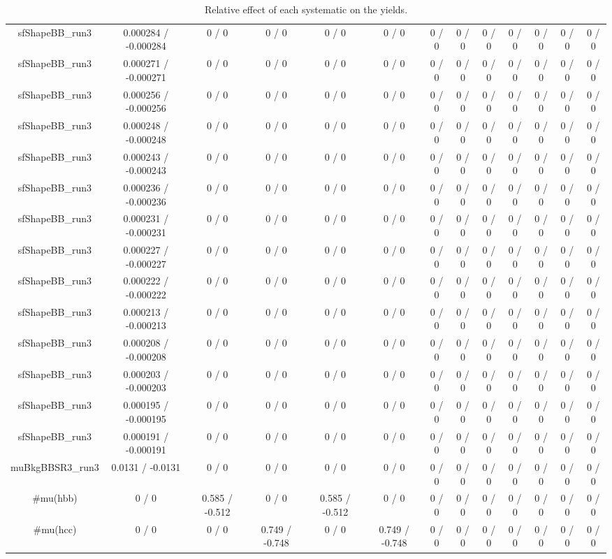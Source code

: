 \documentclass[10pt]{article}
\begin{document}
\begin{table}[htbp]
\begin{center}
\begin{tabular}{|c|c|c|c|c|c|c|c|c|c|c|c|c|}
  sfShapeBB_run3 & 0.000284 / -0.000284 & 0 / 0 & 0 / 0 & 0 / 0 & 0 / 0 & 0 / 0 & 0 / 0 & 0 / 0 & 0 / 0 & 0 / 0 & 0 / 0 & 0 / 0 \\ 
  sfShapeBB_run3 & 0.000271 / -0.000271 & 0 / 0 & 0 / 0 & 0 / 0 & 0 / 0 & 0 / 0 & 0 / 0 & 0 / 0 & 0 / 0 & 0 / 0 & 0 / 0 & 0 / 0 \\ 
  sfShapeBB_run3 & 0.000256 / -0.000256 & 0 / 0 & 0 / 0 & 0 / 0 & 0 / 0 & 0 / 0 & 0 / 0 & 0 / 0 & 0 / 0 & 0 / 0 & 0 / 0 & 0 / 0 \\ 
  sfShapeBB_run3 & 0.000248 / -0.000248 & 0 / 0 & 0 / 0 & 0 / 0 & 0 / 0 & 0 / 0 & 0 / 0 & 0 / 0 & 0 / 0 & 0 / 0 & 0 / 0 & 0 / 0 \\ 
  sfShapeBB_run3 & 0.000243 / -0.000243 & 0 / 0 & 0 / 0 & 0 / 0 & 0 / 0 & 0 / 0 & 0 / 0 & 0 / 0 & 0 / 0 & 0 / 0 & 0 / 0 & 0 / 0 \\ 
  sfShapeBB_run3 & 0.000236 / -0.000236 & 0 / 0 & 0 / 0 & 0 / 0 & 0 / 0 & 0 / 0 & 0 / 0 & 0 / 0 & 0 / 0 & 0 / 0 & 0 / 0 & 0 / 0 \\ 
  sfShapeBB_run3 & 0.000231 / -0.000231 & 0 / 0 & 0 / 0 & 0 / 0 & 0 / 0 & 0 / 0 & 0 / 0 & 0 / 0 & 0 / 0 & 0 / 0 & 0 / 0 & 0 / 0 \\ 
  sfShapeBB_run3 & 0.000227 / -0.000227 & 0 / 0 & 0 / 0 & 0 / 0 & 0 / 0 & 0 / 0 & 0 / 0 & 0 / 0 & 0 / 0 & 0 / 0 & 0 / 0 & 0 / 0 \\ 
  sfShapeBB_run3 & 0.000222 / -0.000222 & 0 / 0 & 0 / 0 & 0 / 0 & 0 / 0 & 0 / 0 & 0 / 0 & 0 / 0 & 0 / 0 & 0 / 0 & 0 / 0 & 0 / 0 \\ 
  sfShapeBB_run3 & 0.000213 / -0.000213 & 0 / 0 & 0 / 0 & 0 / 0 & 0 / 0 & 0 / 0 & 0 / 0 & 0 / 0 & 0 / 0 & 0 / 0 & 0 / 0 & 0 / 0 \\ 
  sfShapeBB_run3 & 0.000208 / -0.000208 & 0 / 0 & 0 / 0 & 0 / 0 & 0 / 0 & 0 / 0 & 0 / 0 & 0 / 0 & 0 / 0 & 0 / 0 & 0 / 0 & 0 / 0 \\ 
  sfShapeBB_run3 & 0.000203 / -0.000203 & 0 / 0 & 0 / 0 & 0 / 0 & 0 / 0 & 0 / 0 & 0 / 0 & 0 / 0 & 0 / 0 & 0 / 0 & 0 / 0 & 0 / 0 \\ 
  sfShapeBB_run3 & 0.000195 / -0.000195 & 0 / 0 & 0 / 0 & 0 / 0 & 0 / 0 & 0 / 0 & 0 / 0 & 0 / 0 & 0 / 0 & 0 / 0 & 0 / 0 & 0 / 0 \\ 
  sfShapeBB_run3 & 0.000191 / -0.000191 & 0 / 0 & 0 / 0 & 0 / 0 & 0 / 0 & 0 / 0 & 0 / 0 & 0 / 0 & 0 / 0 & 0 / 0 & 0 / 0 & 0 / 0 \\ 
  muBkgBBSR3_run3 & 0.0131 / -0.0131 & 0 / 0 & 0 / 0 & 0 / 0 & 0 / 0 & 0 / 0 & 0 / 0 & 0 / 0 & 0 / 0 & 0 / 0 & 0 / 0 & 0 / 0 \\ 
  #mu(hbb) & 0 / 0 & 0.585 / -0.512 & 0 / 0 & 0.585 / -0.512 & 0 / 0 & 0 / 0 & 0 / 0 & 0 / 0 & 0 / 0 & 0 / 0 & 0 / 0 & 0 / 0 \\ 
  #mu(hcc) & 0 / 0 & 0 / 0 & 0.749 / -0.748 & 0 / 0 & 0.749 / -0.748 & 0 / 0 & 0 / 0 & 0 / 0 & 0 / 0 & 0 / 0 & 0 / 0 & 0 / 0 \\ 
\hline 
\end{tabular} 
\caption{Relative effect of each systematic on the yields.} 
\end{center} 
\end{table} 
\end{document}
